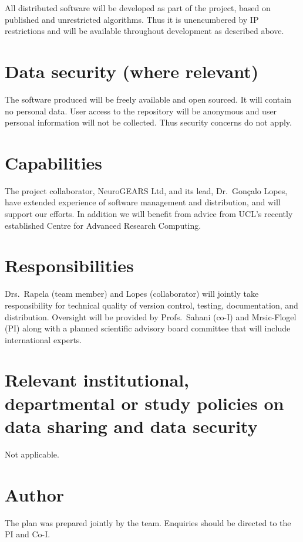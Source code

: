 \documentclass[a4paper,11pt]{article}
\begin{document}
All distributed software will be developed as part of the project, based on published and unrestricted algorithms.  Thus it is unencumbered by IP restrictions and will be available throughout development as described above.

\section{Data security (where relevant)}

The software produced will be freely available and open sourced.  It will contain no personal data.  User access to the repository will be anonymous and user personal information will not be collected.  Thus security concerns do not apply.

\section{Capabilities}

The project collaborator, NeuroGEARS Ltd, and its lead, Dr.~Gon\c{c}alo Lopes, have extended experience of software management and distribution, and will support our efforts.  In addition we will benefit from advice from UCL's recently established Centre for Advanced Research Computing.

\section{Responsibilities}

Drs.~Rapela (team member) and Lopes (collaborator) will jointly take responsibility for technical quality of version control, testing, documentation, and distribution.  Oversight will be provided by Profs.~Sahani (co-I) and Mrsic-Flogel (PI) along with a planned scientific advisory board committee that will include international experts.


\section{Relevant institutional, departmental or study policies on data sharing and data security}

Not applicable.

\section{Author}

The plan was prepared jointly by the team.  Enquiries should be directed to the PI and Co-I.
\end{document}
